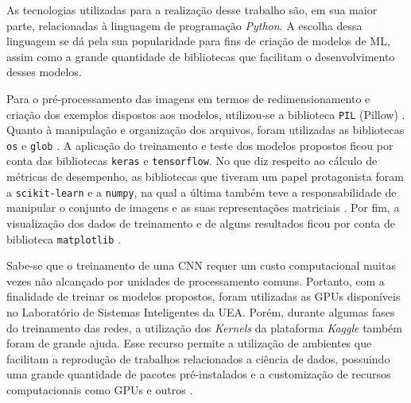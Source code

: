 
As tecnologias utilizadas para a realização desse trabalho são, em sua maior parte, relacionadas à linguagem de programação \emph{Python}. A escolha dessa linguagem se dá pela sua popularidade para fins de criação de modelos de ML, assim como a grande quantidade de bibliotecas que facilitam o desenvolvimento desses modelos.

Para o pré-processamento das imagens em termos de redimensionamento e criação dos exemplos dispostos aos modelos, utilizou-se a biblioteca \texttt{PIL} (Pillow) \cite{pillow}. Quanto à manipulação e organização dos arquivos, foram utilizadas as bibliotecas \texttt{os} e \texttt{glob} \cite{os,glob}. A aplicação do treinamento e teste dos modelos propostos ficou por conta das bibliotecas \texttt{keras} e \texttt{tensorflow}\cite{keras, tensorflow}. No que diz respeito ao cálculo de métricas de desempenho, as bibliotecas que tiveram um papel protagonista foram a \texttt{scikit-learn} e a \texttt{numpy}, na qual a última também teve a responsabilidade de manipular o conjunto de imagens e as suas representações matriciais \cite{sklearn,numpy}. Por fim, a visualização dos dados de treinamento e de alguns resultados ficou por conta de biblioteca \texttt{matplotlib} \cite{matplotlib}.

Sabe-se que o treinamento de uma CNN requer um custo computacional muitas vezes não alcançado por unidades de processamento comuns. Portanto, com a finalidade de treinar os modelos propostos, foram utilizadas as GPUs disponíveis no Laboratório de Sistemas Inteligentes da UEA. Porém, durante algumas fases do treinamento das redes, a utilização dos \emph{Kernels} da plataforma \emph{Kaggle} também foram de grande ajuda. Esse recurso permite a utilização de ambientes que facilitam a reprodução de trabalhos relacionados a ciência de dados, possuindo uma grande quantidade de pacotes pré-instalados e a customização de recursos computacionais como GPUs e outros \cite{kaggle}.
